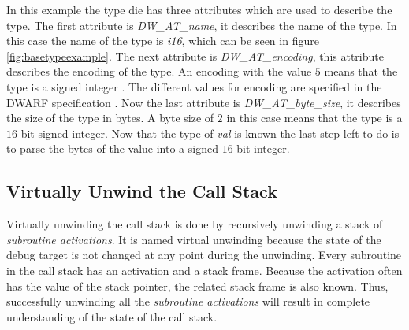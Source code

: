 In this example the type \gls{die} has three attributes which are used to describe the type.
The first attribute is \emph{DW\_AT\_name}, it describes the name of the type.
In this case the name of the type is \emph{i16}, which can be seen in figure \ref{fig:basetypeexample}.
The next attribute is \emph{DW\_AT\_encoding}, this attribute describes the encoding of the type.
An encoding with the value $5$ means that the type is a signed integer \cite{dwarf}.
The different values for encoding are specified in the \gls{DWARF} specification \cite{dwarf}.
Now the last attribute is \emph{DW\_AT\_byte\_size}, it describes the size of the type in bytes.
A byte size of $2$ in this case means that the type is a $16$ bit signed integer.
Now that the type of \emph{val} is known the last step left to do is to parse the bytes of the value into a signed $16$ bit integer.



\subsection{Virtually Unwind the Call Stack}
\label{sec:stacktrace}
 


Virtually unwinding the call stack is done by recursively unwinding a stack of \emph{subroutine activations}.
It is named virtual unwinding because the state of the debug target is not changed at any point during the unwinding.
Every subroutine in the call stack has an activation and a stack frame.
Because the activation often has the value of the stack pointer, the related stack frame is also known.
Thus, successfully unwinding all the \emph{subroutine activations} will result in complete understanding of the state of the call stack.


